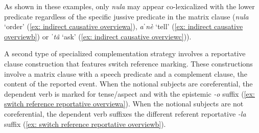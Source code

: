    \label{ex: indirect causative overviewa}
        \label{ex: indirect causative overviewb}
            \label{ex: indirect causative overviewc}
    \z
\z

As shown in these examples, only \textit{nula} may appear co-lexicalized with the lower predicate regardless of the specific jussive predicate in the matrix clause (\textit{nula} `order' (\ref{ex: indirect causative overviewa}), \textit{aˈnè} `tell' (\ref{ex: indirect causative overviewb}) or \textit{ˈtâ} `ask' (\ref{ex: indirect causative overviewc})).

A second type of specialized complementation strategy involves a reportative clause construction that features switch reference marking. These constructions involve a matrix clause with a speech predicate and a complement clause, the content of the reported event. When the notional subjects are coreferential, the dependent verb is marked for tense/aspect and with the epistemic \textit{-o} suffix (\ref{ex: switch reference reportative overviewa}). When the notional subjects are not coreferential, the dependent verb suffixes the different referent reportative \textit{-la} suffix (\ref{ex: switch reference reportative overviewb}).

